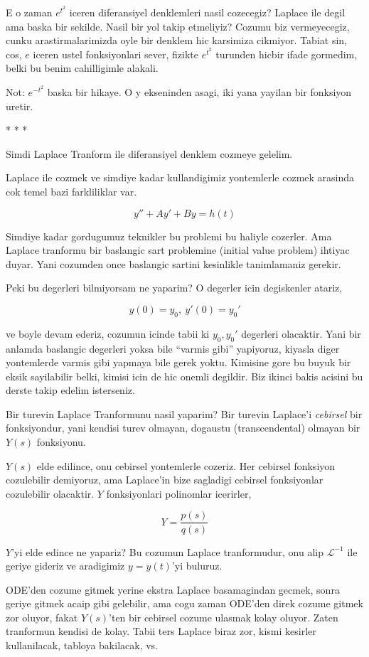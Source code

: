 \documentclass[12pt,fleqn]{article}
\begin{document}
E o zaman $e^{t^2}$ iceren diferansiyel denklemleri nasil cozecegiz?
Laplace ile degil ama baska bir sekilde. Nasil bir yol takip etmeliyiz?
Cozumu biz vermeyecegiz, cunku arastirmalarimizda oyle bir denklem hic
karsimiza cikmiyor. Tabiat sin, cos, $e$ iceren ustel fonksiyonlari
sever, fizikte $e^{t^2}$ turunden hicbir ifade gormedim, belki bu benim
cahilligimle alakali. 

Not: $e^{-t^2}$ baska bir hikaye. O y ekseninden asagi, iki yana yayilan bir
fonksiyon uretir. 

* * * 

Simdi Laplace Tranform ile diferansiyel denklem cozmeye gelelim. 

Laplace ile cozmek ve simdiye kadar kullandigimiz yontemlerle cozmek
arasinda cok temel bazi farkliliklar var. 

\[ y'' + Ay' + By = h(t) \]

Simdiye kadar gordugumuz teknikler bu problemi bu haliyle cozerler. Ama
Laplace tranformu bir baslangic sart problemine (initial value problem)
ihtiyac duyar. Yani cozumden once baslangic sartini kesinlikle tanimlamaniz
gerekir. 

Peki bu degerleri bilmiyorsam ne yaparim? O degerler icin degiskenler
atariz, 

\[ y(0) = y_0, \ y'(0) = y_0' \]

ve boyle devam ederiz, cozumun icinde tabii ki $y_0,y_0'$ degerleri
olacaktir. Yani bir anlamda baslangic degerleri yoksa bile ``varmis gibi''
yapiyoruz, kiyasla diger yontemlerde varmis gibi yapmaya bile gerek
yoktu. Kimisine gore bu buyuk bir eksik sayilabilir belki, kimisi icin de
hic onemli degildir. Biz ikinci bakis acisini bu derste takip edelim
isterseniz.

Bir turevin Laplace Tranformunu nasil yaparim? Bir turevin Laplace'i
{\em cebirsel} bir fonksiyondur, yani kendisi turev olmayan, dogaustu
(transcendental) olmayan bir $Y(s)$ fonksiyonu. 

$Y(s)$ elde edilince, onu cebirsel yontemlerle cozeriz. Her cebirsel
fonksiyon cozulebilir demiyoruz, ama Laplace'in bize sagladigi cebirsel
fonksiyonlar cozulebilir olacaktir. $Y$ fonksiyonlari polinomlar icerirler, 

\[ Y = \frac{p(s)}{q(s)} \]

$Y$'yi elde edince ne yapariz? Bu cozumun Laplace tranformudur, onu alip
$\mathcal{L}^{-1}$ ile geriye gideriz ve aradigimiz $y = y(t)$'yi buluruz. 

ODE'den cozume gitmek yerine ekstra Laplace basamagindan gecmek, sonra
geriye gitmek acaip gibi gelebilir, ama cogu zaman ODE'den direk cozume
gitmek zor oluyor, fakat $Y(s)$'ten bir cebirsel cozume ulasmak kolay
oluyor. Zaten tranformun kendisi de kolay. Tabii ters Laplace biraz zor,
kismi kesirler kullanilacak, tabloya bakilacak, vs. 
\end{document}
